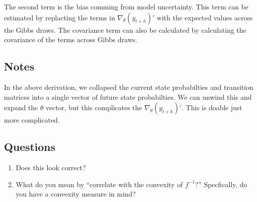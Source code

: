 \documentclass[12pt]{article}
\begin{document}
The second term is the bias comming from model uncertainty. This term can be estimated 
by replacting the terms in $\nabla_{\theta}(y_{t+h})'$ with the expected values across the 
Gibbs draws. The covariance term can also be calculated by calculating the covariance of the
terms across Gibbs draws. 

\subsection{Notes}
In the above derivation, we collapsed the current state probabilties and transition matrices into 
a single vector of future state probabilties. We can unwind this and expand the $\theta$ vector,
but this complicates the $\nabla_{\theta}(y_{t+h})'$. This is doable just more complicated. 

\subsection{Questions}
\begin{enumerate}
  \item Does this look correct?
  \item What do you mean by ``correlate with the convexity of $f^{-1}$?'' Specfically, do you have a convexity measure in mind?
\end{enumerate}
\end{document}
